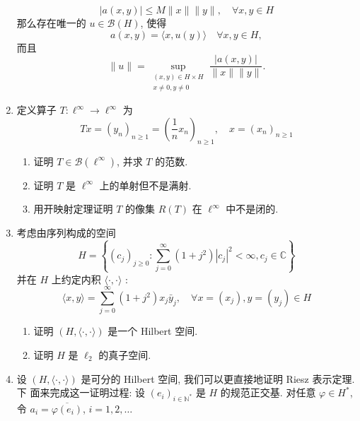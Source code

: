 \begin{enumerate}
        \[
        |a(x, y)| \leq M\|x\|\|y\|, \quad \forall x, y \in H
        \]
        那么存在唯一的 $u \in \mathcal{B}(H)$, 使得
        \[
        a(x, y)=\langle x, u(y)\rangle \quad \forall x, y \in H,
        \]
        而且
        \[
        \|u\|=\sup _{\substack{(x, y) \in H \times H \\ x \neq  0, y \neq  0}} \frac{|a(x, y)|}{\|x\|\|y\|}.
        \]
        \item 定义算子 $T: \ell^{\infty} \rightarrow \ell^{\infty}$ 为
        \[
        T x=\left(y_{n}\right)_{n \geq 1}=\left(\frac{1}{n} x_{n}\right)_{n \geq 1}, \quad x=\left(x_{n}\right)_{n \geq 1}
        \]
            \begin{enumerate}
                \item 证明 $T \in \mathcal{B}\left(\ell^{\infty}\right)$, 并求 $T$ 的范数.
                \item 证明 $T$ 是 $\ell^{\infty}$ 上的单射但不是满射.
                \item 用开映射定理证明 $T$ 的像集 $R(T)$ 在 $\ell^{\infty}$ 中不是闭的.
            \end{enumerate}
        \item 考虑由序列构成的空间
        \[
        H=\left\{\left(c_{j}\right)_{j \geq 0}: \sum_{j=0}^{\infty}\left(1+j^{2}\right)\left|c_{j}\right|^{2}<\infty, c_{j} \in \mathbb{C}\right\}
        \]
        并在 $H$ 上约定内积 $\langle\cdot, \cdot\rangle$ :
        \[
        \langle x, y\rangle=\sum_{j=0}^{\infty}\left(1+j^{2}\right) x_{j} \bar{y}_{j}, \quad \forall x=\left(x_{j}\right), y=\left(y_{j}\right) \in H
        \]
            \begin{enumerate}
                \item 证明 $(H,\langle\cdot, \cdot\rangle)$ 是一个 Hilbert 空间.
                \item 证明 $H$ 是 $\ell_{2}$ 的真子空间.
            \end{enumerate}
        \item 设 $(H,\langle\cdot, \cdot\rangle)$ 是可分的 Hilbert 空间, 我们可以更直接地证明 Riesz 表示定理. 下 面来完成这一证明过程: 设 $\left(e_{i}\right)_{i \in \mathbb{N}^{*}}$ 是 $H$ 的规范正交基. 对任意 $\varphi \in H^{*}$, 令 $a_{i}=\overline{\varphi\left(e_{i}\right)}$, $i=1,2, \ldots$

\end{enumerate}

